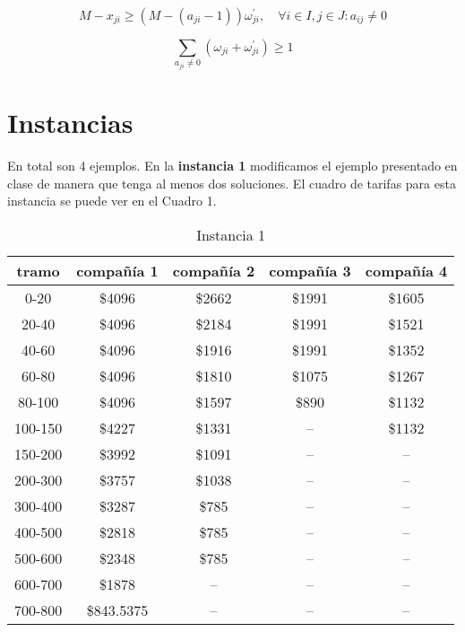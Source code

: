\documentclass[12pt]{article}
\begin{document}
\[
M - x_{ji} \geq (M - (a_{ji} - 1))\omega^{'}_{ji}, \quad \forall i \in I, j \in J : a_{ij} \neq 0
\]

\[
 \sum_{a_{ji} \neq 0}{(\omega_{ji} + \omega^{'}_{ji})}\geq 1
\]

\bigskip
\section{Instancias}
 
En total son 4 ejemplos. En la \textbf{instancia 1} modificamos el ejemplo presentado en clase de manera que tenga al menos dos soluciones. El cuadro de tarifas para esta instancia se puede ver en el Cuadro 1.

\bigskip

\begin{table}[h!]
\centering
\begin{tabular}{|| c || c | c | c | c ||}  
 \hline
     tramo & compañía 1 & compañía 2 & compañía 3 & compañía 4 \\ [0.5ex] 
 \hline\hline
 0-20 & \$4096 & \$2662 & \$1991 & \$1605 \\ 
 20-40 & \$4096 & \$2184 & \$1991 & \$1521 \\
 40-60 & \$4096 & \$1916 & \$1991 & \$1352 \\
 60-80 & \$4096 & \$1810 & \$1075 & \$1267 \\
 80-100 & \$4096 & \$1597 & \$890 & \$1132 \\
 100-150 & \$4227 & \$1331 & -- & \$1132 \\
 150-200 & \$3992 & \$1091 & -- & -- \\
 200-300 & \$3757 & \$1038 & -- & -- \\
 300-400 & \$3287 & \$785 & -- & -- \\
 400-500 & \$2818 & \$785 & -- & -- \\
 500-600 & \$2348 & \$785 & -- & -- \\
 600-700 & \$1878 & -- & -- & -- \\
 700-800 & \$843.5375 & -- & -- & -- \\ [1ex] 
 \hline
\end{tabular}
\caption{Instancia 1}
\label{table:1}
\end{table}
\end{document}
